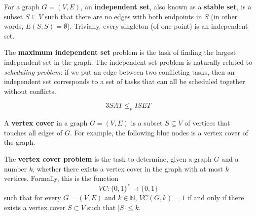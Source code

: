   \begin{definition}
  For a graph $G = (V, E)$, an \textbf{independent set}, also known as a \textbf{stable set}, is a subset $S \subseteq V$ such that there are no edges with both endpoints in $S$ (in other words, $E(S, S) = \emptyset$). Trivially, every singleton (of one point) is an independent set. 
  \end{definition}

  The \textbf{maximum independent set} problem is the task of finding the largest independent set in the graph. The independent set problem is naturally related to \textit{scheduling problem}: if we put an edge between two conflicting tasks, then an independent set corresponds to a set of tasks that can all be scheduled together without conflicts. 

  \begin{theorem}
  \[3SAT \leq_p ISET\]
  \end{theorem}

  \begin{definition}
  A \textbf{vertex cover} in a graph $G = (V, E)$ is a subset $S \subseteq V$ of vertices that touches all edges of $G$. For example, the following blue nodes is a vertex cover of the graph. 
  \begin{center}
  \end{center}

  The \textbf{vertex cover problem} is the task to determine, given a graph $G$ and a number $k$, whether there exists a vertex cover in the graph with at most $k$ vertices. Formally, this is the function 
  \[VC: \{0,1\}^* \longrightarrow \{0,1\}\]
  such that for every $G = (V, E)$ and $k \in \mathbb{N}$, $VC(G, k) = 1$ if and only if there exists a vertex cover $S \subset V$ such that $|S| \leq k$. 
  \end{definition}

